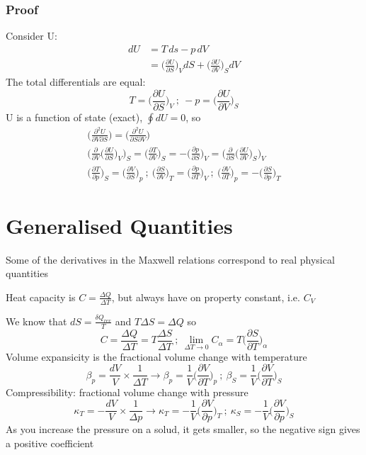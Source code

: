 \documentclass[a4paper, 11pt, normalem]{report}
\newcommand\p{\partial}
\begin{document}
\subsubsection{Proof}
Consider U:
\begin{align*}
    dU &= T\,ds - p\,dV \\
    &= \Big(\frac{\p U}{\p S}\Big)_V dS + \Big(\frac{\p U}{\p V}\Big)_S dV
\end{align*}
The total differentials are equal:
\begin{equation*}
    T = \Big(\frac{\p U}{\p S}\Big)_V ~;~ -p = \Big(\frac{\p U}{\p V}\Big)_S
\end{equation*}
U is a function of state (exact), $\oint dU = 0$, so
\begin{gather*}
    \Big(\frac{\p^2 U}{\p V \p S}\Big) = \Big(\frac{\p^2 U}{\p S \p V}\Big) \\
    \bigg(\frac{\p}{\p V} \Big(\frac{\p U}{\p S} \Big)_V \bigg)_S = \boxed{\Big(\frac{\p T}{\p V}\Big)_S = -\Big(\frac{\p p}{\p S} \Big)_V} = \bigg(\frac{\p}{\p S} \Big(\frac{\p U}{\p V}\Big)_S \bigg)_V \\
    \Big(\frac{\p T}{\p p}\Big)_S = \Big(\frac{\p V}{\p S}\Big)_p ~;~ \Big(\frac{\p S}{\p V} \Big)_T = \Big(\frac{\p p}{\p T}\Big)_V ~;~ \Big(\frac{\p V}{\p T}\Big)_p = -\Big(\frac{\p S}{\p p} \Big)_T
\end{gather*}

\section{Generalised Quantities}
Some of the derivatives in the Maxwell relations correspond to real physical quantities

Heat capacity is $C = \frac{\Delta Q}{\Delta T}$, but always have on property constant, i.e. $C_V$

We know that $dS = \frac{\delta Q_{rev}}{T}$ and $T\Delta S = \Delta Q$ so
\begin{equation*}
    C = \frac{\Delta Q}{\Delta T} = T\frac{\Delta S}{\Delta T} ~;~ \lim_{\Delta T \to 0} C_{\alpha} = T\Big(\frac{\p S}{\p T}\Big)_{\alpha}
\end{equation*}
Volume expansicity is the fractional volume change with temperature
\begin{equation*}
    \beta_{p} = \frac{dV}{V}\times\frac{1}{\Delta T} \to \beta_{p} = \frac{1}{V} \Big(\frac{\p V}{\p T}\Big)_p ~;~ \beta_S = \frac{1}{V} \Big(\frac{\p V}{\p T}\Big)_S
\end{equation*}
Compressibility: fractional volume change with pressure
\begin{equation*}
    \kappa_T = -\frac{dV}{V} \times \frac{1}{\Delta p} \to \kappa_T = -\frac{1}{V} \Big(\frac{\p V}{\p p}\Big)_T ~;~ \kappa_S = -\frac{1}{V} \Big(\frac{\p V}{\p p}\Big)_S
\end{equation*}
As you increase the pressure on a solud, it gets smaller, so the negative sign gives a positive coefficient
\end{document}

